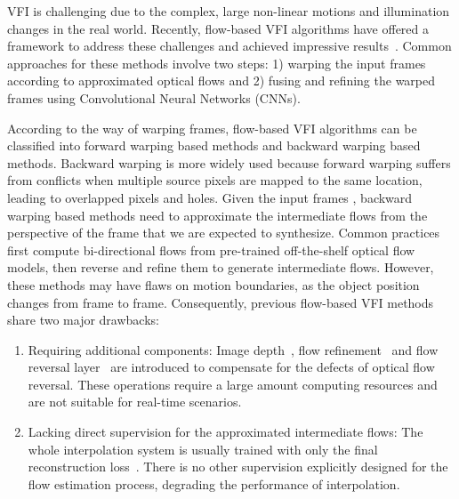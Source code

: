 \documentclass[10pt,twocolumn,letterpaper]{article}
\begin{document}
VFI is challenging due to the complex, large non-linear motions and illumination changes in the real world. Recently, flow-based VFI algorithms have offered a framework to address these challenges and achieved impressive results~\cite{jiang2018super, niklaus2018context, xue2019video, bao2019depth}. Common approaches for these methods involve two steps: 1) warping the input frames according to approximated optical flows and 2) fusing and refining the warped frames using Convolutional Neural Networks (CNNs). 

According to the way of warping frames, flow-based VFI algorithms can be classified into forward warping based methods and backward warping based methods. Backward warping is more widely used because forward warping suffers from conflicts when multiple source pixels are mapped to the same location, leading to overlapped pixels and holes. Given the input frames , backward warping based methods need to approximate the intermediate flows  from the perspective of the frame  that we are expected to synthesize. Common practices~\cite{jiang2018super, bao2019depth, xu2019quadratic, liu2020enhanced} first compute bi-directional flows from pre-trained off-the-shelf optical flow models, then reverse and refine them to generate intermediate flows. However, these methods may have flaws on motion boundaries, as the object position changes from frame to frame. Consequently, previous flow-based VFI methods share two major drawbacks:
\begin{enumerate}[1)] \vspace{-0.5em}
	\item Requiring additional components: Image depth~\cite{bao2019depth}, flow refinement~\cite{jiang2018super} and flow reversal layer~\cite{xu2019quadratic} are introduced to compensate for the defects of optical flow reversal. These operations require a large amount computing resources and are not suitable for real-time scenarios. \vspace{-0.5em}
	\item Lacking direct supervision for the approximated intermediate flows: The whole interpolation system is usually trained with only the final reconstruction loss~\cite{park2020bmbc}. There is no other supervision explicitly designed for the flow estimation process, degrading the performance of interpolation. \vspace{-0.5em}
\end{enumerate}
\end{document}
